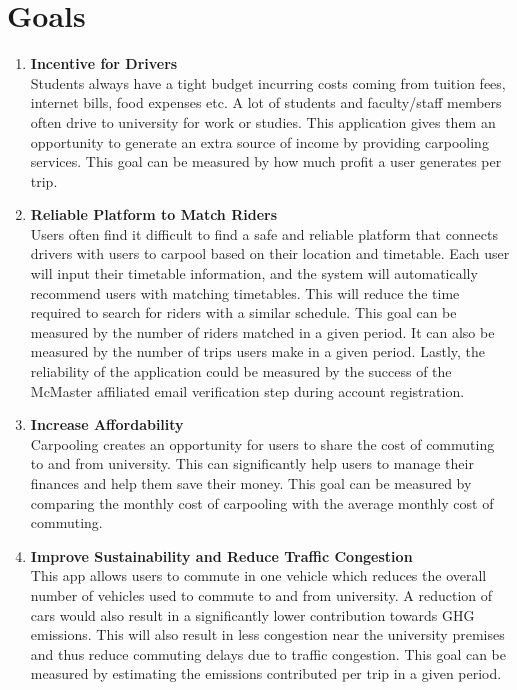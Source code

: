 \documentclass{article}
\begin{document}
\section{Goals}
\begin{enumerate}
\item \textbf{Incentive for Drivers}\\ 
Students always have a tight budget incurring costs coming from tuition fees, internet bills, food expenses etc. A lot of students and faculty/staff members often drive to university for work or studies. This application gives them an opportunity to generate an extra source of income by providing carpooling services. This goal can be measured by how much profit a user generates per trip.  

\item \textbf{Reliable Platform to Match Riders} \\
Users often find it difficult to find a safe and reliable platform that connects drivers with users to carpool based on their location and timetable. Each user will input their timetable information, and the system will automatically recommend users with matching timetables. This will reduce the time required to search for riders with a similar schedule. This goal can be measured by the number of riders matched in a given period. It can also be measured by the number of trips users make in a given period. Lastly, the reliability of the application could be measured by the success of the McMaster affiliated email verification step during account registration.

\item \textbf{Increase Affordability} \\
Carpooling creates an opportunity for users to share the cost of commuting to and from university. This can significantly help users to manage their finances and help them save their money. This goal can be measured by comparing the monthly cost of carpooling with the average monthly cost of commuting.

\item \textbf{Improve Sustainability and Reduce Traffic Congestion} \\
This app allows users to commute in one vehicle which reduces the overall number of vehicles used to commute to and from university. A reduction of cars would also result in a significantly lower contribution towards GHG emissions. This will also result in less congestion near the university premises and thus reduce commuting delays due to traffic congestion.  This goal can be measured by estimating the emissions contributed per trip in a given period.  


\end{enumerate}
\end{document}
